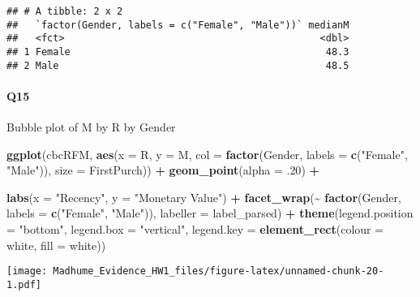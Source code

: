 \documentclass[
]{article}
\newenvironment{Shaded}{\begin{snugshade}}{\end{snugshade}}
\newcommand{\AttributeTok}[1]{\textcolor[rgb]{0.13,0.29,0.53}{#1}}
\newcommand{\DecValTok}[1]{\textcolor[rgb]{0.00,0.00,0.81}{#1}}
\newcommand{\FunctionTok}[1]{\textcolor[rgb]{0.13,0.29,0.53}{\textbf{#1}}}
\newcommand{\NormalTok}[1]{#1}
\newcommand{\SpecialCharTok}[1]{\textcolor[rgb]{0.81,0.36,0.00}{\textbf{#1}}}
\newcommand{\StringTok}[1]{\textcolor[rgb]{0.31,0.60,0.02}{#1}}
\begin{document}
\begin{verbatim}
## # A tibble: 2 x 2
##   `factor(Gender, labels = c("Female", "Male"))` medianM
##   <fct>                                            <dbl>
## 1 Female                                            48.3
## 2 Male                                              48.5
\end{verbatim}

\paragraph{Q15}\label{q15}

Bubble plot of M by R by Gender

\begin{Shaded}
\begin{Highlighting}[]
\FunctionTok{ggplot}\NormalTok{(cbcRFM, }\FunctionTok{aes}\NormalTok{(}\AttributeTok{x =}\NormalTok{ R, }\AttributeTok{y =}\NormalTok{ M, }\AttributeTok{col =} \FunctionTok{factor}\NormalTok{(Gender, }\AttributeTok{labels =} \FunctionTok{c}\NormalTok{(}\StringTok{"Female"}\NormalTok{, }\StringTok{"Male"}\NormalTok{)), }\AttributeTok{size =}\NormalTok{ FirstPurch)) }\SpecialCharTok{+}
  \FunctionTok{geom\_point}\NormalTok{(}\AttributeTok{alpha =}\NormalTok{ .}\DecValTok{20}\NormalTok{) }\SpecialCharTok{+}
  
  \FunctionTok{labs}\NormalTok{(}\AttributeTok{x =} \StringTok{"Recency"}\NormalTok{, }\AttributeTok{y =} \StringTok{"Monetary Value"}\NormalTok{) }\SpecialCharTok{+}
  \FunctionTok{facet\_wrap}\NormalTok{(}\SpecialCharTok{\textasciitilde{}} \FunctionTok{factor}\NormalTok{(Gender, }\AttributeTok{labels =} \FunctionTok{c}\NormalTok{(}\StringTok{"Female"}\NormalTok{, }\StringTok{"Male"}\NormalTok{)), }\AttributeTok{labeller =}\NormalTok{ label\_parsed) }\SpecialCharTok{+}
  \FunctionTok{theme}\NormalTok{(}\AttributeTok{legend.position =} \StringTok{"bottom"}\NormalTok{, }\AttributeTok{legend.box =} \StringTok{"vertical"}\NormalTok{, }
        \AttributeTok{legend.key =} \FunctionTok{element\_rect}\NormalTok{(}\AttributeTok{colour =} \StringTok{\textquotesingle{}white\textquotesingle{}}\NormalTok{, }\AttributeTok{fill =} \StringTok{\textquotesingle{}white\textquotesingle{}}\NormalTok{))}
\end{Highlighting}
\end{Shaded}

\texttt{[image: Madhume\_Evidence\_HW1\_files/figure-latex/unnamed-chunk-20-1.pdf]}
\end{document}

